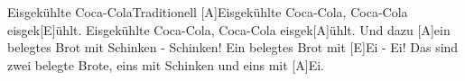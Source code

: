 \documentclass[../main.tex]{subfiles}
\begin{document}
\begin{song}{Eisgekühlte Coca-Cola}{Traditionell}{}
[A]Eisgekühlte  Coca-Cola, Coca-Cola eisgek[E]{ü}hlt.
Eisgekühlte  Coca-Cola, Coca-Cola eisgek[A]{ü}hlt.
Und dazu [A]ein belegtes Brot mit Schinken - Schinken!
Ein belegtes Brot mit [E]Ei - Ei!
Das sind zwei belegte Brote, eins mit Schinken und eins mit [A]Ei.
\end{song}
\end{document}
